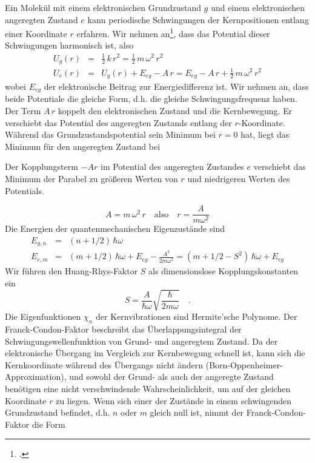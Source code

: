 Ein Molekül mit einem elektronischen Grundzustand $g$ und einem elektronischen angeregten Zustand $e$ kann periodische Schwingungen der Kernpositionen entlang einer Koordinate $r$ erfahren. 
Wir nehmen an\footcite{Kuzmany}, dass das Potential dieser Schwingungen harmonisch ist, also
\begin{eqnarray}
 U_g(r) &=& \frac{1}{2} \, k\, r^2 = \frac{1}{2} \, m \, \omega^2 \, r^2 \\
  U_e(r) &=&  U_g(r) + E_{eg} - A \, r = E_{eg}  - A \, r + \frac{1}{2} \, m \, \omega^2 \, r^2 
 \end{eqnarray}
wobei $E_{eg}$ der elektronische Beitrag zur Energiedifferenz ist. Wir nehmen an, dass beide Potentiale die gleiche Form, d.h. die gleiche Schwingungsfrequenz haben. Der Term $A \, r$ koppelt den elektronischen Zustand und die Kernbewegung. Er verschiebt das Potential des angeregten Zustands entlang der $r$-Koordinate. Während das Grundzustandspotential sein Minimum bei $r=0$ hat, liegt das Minimum für den angeregten Zustand bei
%
%
\begin{marginfigure}
\caption{Der Kopplungsterm $-A r$ im Potential des angeregten Zustandes $e$ verschiebt das Minimum der Parabel zu größeren Werten von $r$ und niedrigeren Werten des Potentials. }
\end{marginfigure}
%
%
\begin{equation}
 A = m \, \omega^2 \,  r	 \quad \text{also} \quad r = \frac{A}{m \omega^2}
\end{equation}
Die Energien der quantenmechanischen Eigenzustände sind 
\begin{eqnarray}
  E_{g, n} &=&  (n + 1/2) \, \hbar \omega  \\
  E_{e, m} &=&  (m + 1/2) \, \hbar \omega  +  E_{eg} - \frac{A^2}{2 m \omega^2} =
   (m + 1/2 - S^2) \, \hbar \omega  +  E_{eg} 
\end{eqnarray}
Wir führen den Huang-Rhys-Faktor $S$ als dimensionslose Kopplungskonstanten ein
\begin{equation}
 S = \frac{A}{\hbar \omega} \sqrt{\frac{\hbar}{2 m \omega}} \quad .
\end{equation}
Die Eigenfunktionen $\chi_n$ der Kernvibrationen sind Hermite'sche Polynome. Der Franck-Condon-Faktor beschreibt das Überlappungsintegral der Schwingungswellenfunktion von Grund- und angeregtem Zustand. Da der elektronische Übergang im Vergleich zur Kernbewegung schnell ist, kann sich die Kernkoordinate während des Übergangs nicht ändern (Born-Oppenheimer-Approximation), und sowohl der Grund- als auch der angeregte Zustand benötigen eine nicht verschwindende Wahrscheinlichkeit, um auf der gleichen Koordinate $r$ zu liegen. Wenn sich einer der Zustände in einem schwingenden Grundzustand befindet, d.h. $n$ oder $m$ gleich null ist, nimmt der Franck-Condon-Faktor die Form
